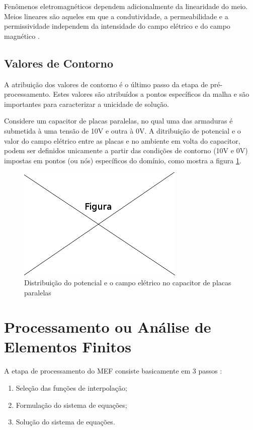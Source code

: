 Fenômenos eletromagnéticos dependem adicionalmente da linearidade do meio. Meios lineares são aqueles em que a condutividade, a permeabilidade e a permissividade independem da intensidade do campo elétrico e do campo magnético \citep[p. 20]{sadiku} .


\subsection{Valores de Contorno}
A atribuição dos valores de contorno é o último passo da etapa de pré- processamento. Estes valores são atribuídos a pontos específicos da malha e são importantes para caracterizar a unicidade de solução. \citep[p. 7]{zien}

Considere um capacitor de placas paralelas, no qual uma das armaduras é submetida à uma tensão de 10V e outra à 0V. A ditribuição de potencial e o valor do campo elétrico entre as placas e no ambiente em volta do capacitor, podem ser definidos unicamente a partir das condições de contorno (10V e 0V) impostas em pontos (ou nós) específicos do domínio, como mostra a figura \ref{fig:capacitor}.

\begin{figure}[!htb]
\centering
\includegraphics[scale=0.5]{figuras/temp.png}
\caption{Distribuição do potencial e o campo elétrico no capacitor de placas paralelas}
\label{fig:capacitor}
\end{figure}


\section{Processamento ou Análise de Elementos Finitos}
A etapa de processamento do MEF consiste basicamente em 3 passos \citep[p. 31]{jin}:

\begin{enumerate}  
\item Seleção das funções de interpolação;
\item Formulação do sistema de equações;
\item Solução do sistema de equações. 
\end{enumerate}

